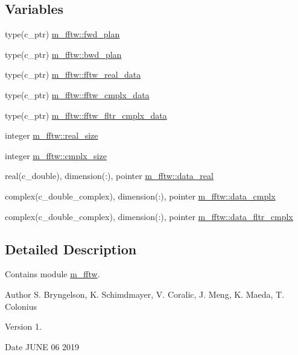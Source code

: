 \subsection*{Variables}
\begin{DoxyCompactItemize}
\item 
type(c\+\_\+ptr) \hyperlink{namespacem__fftw_af605e2137e55bfc3b5e95bbdad51803a}{m\+\_\+fftw\+::fwd\+\_\+plan}
\item 
type(c\+\_\+ptr) \hyperlink{namespacem__fftw_a5120d0924ad190de0c0967cfdfdffb64}{m\+\_\+fftw\+::bwd\+\_\+plan}
\item 
type(c\+\_\+ptr) \hyperlink{namespacem__fftw_a0db6f31d6d28b16d18982654bd98501a}{m\+\_\+fftw\+::fftw\+\_\+real\+\_\+data}
\item 
type(c\+\_\+ptr) \hyperlink{namespacem__fftw_a5ec1a65aeb900c5fc0c437c04a15bb1c}{m\+\_\+fftw\+::fftw\+\_\+cmplx\+\_\+data}
\item 
type(c\+\_\+ptr) \hyperlink{namespacem__fftw_acf83109d9518ac141074223356bc9385}{m\+\_\+fftw\+::fftw\+\_\+fltr\+\_\+cmplx\+\_\+data}
\item 
integer \hyperlink{namespacem__fftw_a7963f79188a7191b7d8436707e2aa4a5}{m\+\_\+fftw\+::real\+\_\+size}
\item 
integer \hyperlink{namespacem__fftw_afa99ee82497ae0ee316e97734ad0d7d3}{m\+\_\+fftw\+::cmplx\+\_\+size}
\item 
real(c\+\_\+double), dimension(\+:), pointer \hyperlink{namespacem__fftw_a5fc31000de6fec8b2dc1a9a1259f8089}{m\+\_\+fftw\+::data\+\_\+real}
\item 
complex(c\+\_\+double\+\_\+complex), dimension(\+:), pointer \hyperlink{namespacem__fftw_a46b5b6c6849f50f0fe5f96301520e981}{m\+\_\+fftw\+::data\+\_\+cmplx}
\item 
complex(c\+\_\+double\+\_\+complex), dimension(\+:), pointer \hyperlink{namespacem__fftw_a2baa49912c2585f5937bcb41804edc3a}{m\+\_\+fftw\+::data\+\_\+fltr\+\_\+cmplx}
\end{DoxyCompactItemize}


\subsection{Detailed Description}
Contains module \hyperlink{namespacem__fftw}{m\+\_\+fftw}. 

\begin{DoxyAuthor}{Author}
S. Bryngelson, K. Schimdmayer, V. Coralic, J. Meng, K. Maeda, T. Colonius 
\end{DoxyAuthor}
\begin{DoxyVersion}{Version}
1. 
\end{DoxyVersion}
\begin{DoxyDate}{Date}
J\+U\+NE 06 2019 
\end{DoxyDate}
